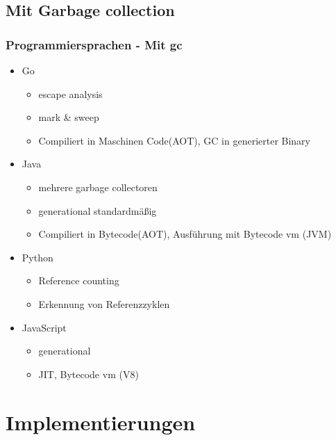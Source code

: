 \documentclass{beamer}
\begin{document}
        \subsection{Mit Garbage collection}
            \begin{frame}
                \frametitle{Programmiersprachen - Mit gc}
                \begin{itemize}
                    \item Go
                    \begin{itemize}
                        \item escape analysis
                        \item mark \& sweep
                        \item Compiliert in Maschinen Code(AOT), GC in generierter Binary
                    \end{itemize}
                    \item Java
                    \begin{itemize}
                        \item mehrere garbage collectoren
                        \item generational standardmäßig
                        \item Compiliert in Bytecode(AOT), Ausführung mit Bytecode vm (JVM)
                    \end{itemize}
                    \item Python
                    \begin{itemize}
                        \item Reference counting
                        \item Erkennung von Referenzzyklen
                    \end{itemize}
                    \item JavaScript
                    \begin{itemize}
                        \item generational
                        \item JIT, Bytecode vm (V8)
                    \end{itemize}
                \end{itemize}
            \end{frame}

    \section{Implementierungen}
\end{document}
